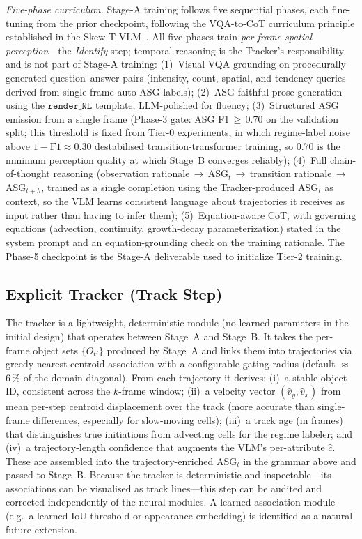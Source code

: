 \documentclass[fleqn,10pt]{wlscirep}
\begin{document}
\textit{Five-phase curriculum.}
Stage-A training follows five sequential phases, each fine-tuning from the prior checkpoint, following the VQA-to-CoT curriculum principle established in the Skew-T VLM~\cite{lee2025skewt}.
All five phases train \emph{per-frame spatial perception}---the \emph{Identify} step; temporal reasoning is the Tracker's responsibility and is not part of Stage-A training:
(1)~Visual VQA grounding on procedurally generated question--answer pairs (intensity, count, spatial, and tendency queries derived from single-frame auto-ASG labels);
(2)~ASG-faithful prose generation using the $\texttt{render\_NL}$ template, LLM-polished for fluency;
(3)~Structured ASG emission from a single frame (Phase-3 gate: ASG F1\,$\ge$\,0.70 on the validation split; this threshold is fixed from Tier-0 experiments, in which regime-label noise above $1-\text{F1}\approx0.30$ destabilised transition-transformer training, so $0.70$ is the minimum perception quality at which Stage~B converges reliably);
(4)~Full chain-of-thought reasoning (observation rationale\,$\to$\,ASG$_t$\,$\to$\,transition rationale\,$\to$\,ASG$_{t+h}$, trained as a single completion using the Tracker-produced $\text{ASG}_t$ as context, so the VLM learns consistent language about trajectories it receives as input rather than having to infer them);
(5)~Equation-aware CoT, with governing equations (advection, continuity, growth-decay parameterization) stated in the system prompt and an equation-grounding check on the training rationale.
The Phase-5 checkpoint is the Stage-A deliverable used to initialize Tier-2 training.

\subsection*{Explicit Tracker (Track Step)}

The tracker is a lightweight, deterministic module (no learned parameters in the initial design) that operates between Stage~A and Stage~B.
It takes the per-frame object sets $\{O_{t'}\}$ produced by Stage~A and links them into trajectories via greedy nearest-centroid association with a configurable gating radius (default $\approx$6\,\% of the domain diagonal).
From each trajectory it derives:
(i)~a stable object ID, consistent across the $k$-frame window;
(ii)~a velocity vector $(\hat{v}_y, \hat{v}_x)$ from mean per-step centroid displacement over the track (more accurate than single-frame differences, especially for slow-moving cells);
(iii)~a track age (in frames) that distinguishes true initiations from advecting cells for the regime labeler;
and (iv)~a trajectory-length confidence that augments the VLM's per-attribute $\hat{c}$.
These are assembled into the trajectory-enriched $\text{ASG}_t$ in the grammar above and passed to Stage~B.
Because the tracker is deterministic and inspectable---its associations can be visualised as track lines---this step can be audited and corrected independently of the neural modules.
A learned association module (e.g.\ a learned IoU threshold or appearance embedding) is identified as a natural future extension.
\end{document}
